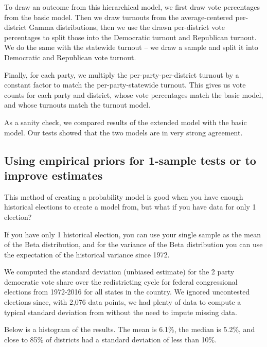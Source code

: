 \documentclass[preprint,12pt]{article}
\begin{document}
To draw an outcome from this hierarchical model, we first draw vote percentages from the basic model. Then we draw turnouts from the average-centered per-district Gamma distributions, then we use the drawn per-district vote percentages to split those into the Democratic turnout and Republican turnout.  We do the same with the statewide turnout -- we draw a sample and split it into Democratic and Republican vote turnout. 
 
Finally, for each party, we multiply the per-party-per-district turnout by a constant factor to match the per-party-statewide turnout.  This gives us vote counts for each party and district, whose vote percentages match the basic model, and whose turnouts match the turnout model.
 
As a sanity check, we compared results of the extended model with the basic model.  Our tests showed that the two models are in very strong agreement. 
 
 
\subsection{Using empirical priors for 1-sample tests or to improve estimates}
 
This method of creating a probability model is good when you have enough historical elections to create a model from, but what if you have data for only 1 election?
 
If you have only 1 historical election, you can use your single sample as the mean of the Beta distribution, and for the variance of the Beta distribution you can use the expectation of the historical variance since 1972.
 
We computed the standard deviation (unbiased estimate) for the 2 party democratic vote share over the redistricting cycle for federal congressional elections from 1972-2016 for all states in the country. We ignored uncontested elections since, with 2,076 data points, we had plenty of data to compute a typical standard deviation from without the need to impute missing data.
 
Below is a histogram of the results.  The mean is 6.1\%, the median is 5.2\%, and close to 85\% of districts had a standard deviation of less than 10\%. 
\end{document}
